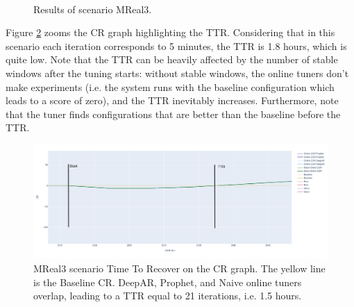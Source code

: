 \documentclass[a4paper, 12pt]{article} %
\begin{document}
	\begin{figure}\centering
		 \\
		\caption{Results of scenario MReal3.}
		\label{fig:results_cgp_bank1}
	\end{figure}
	
	Figure \ref{fig:results_cgp_bank3_ttr} zooms the CR graph highlighting the TTR. Considering that in this scenario each iteration corresponds to 5 minutes, the TTR is 1.8 hours, which is quite low. Note that the TTR can be heavily affected by the number of stable windows after the tuning starts: without stable windows, the online tuners don't make experiments (i.e. the system runs with the baseline configuration which leads to a score of zero), and the TTR inevitably increases. Furthermore, note that the tuner finds configurations that are better than the baseline before the TTR.
	
	
	\begin{figure} \centering
		\includegraphics[width=5.5in]{img/results/mongo_allianz_10ms_kmeans_ttr.png}
		\caption{MReal3 scenario Time To Recover on the CR graph. The yellow line is the Baseline CR. DeepAR, Prophet, and Naive online tuners overlap, leading to a TTR equal to 21 iterations, i.e. 1.5 hours.}
		\label{fig:results_cgp_bank3_ttr}
	\end{figure}
	
\end{document}
